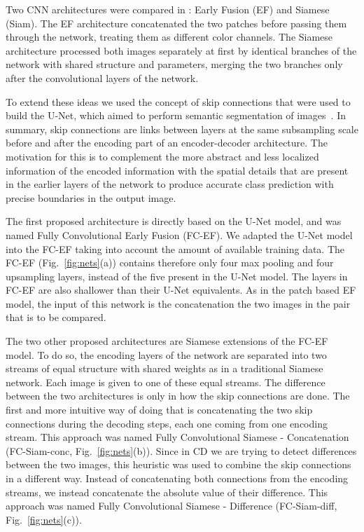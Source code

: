 \documentclass{article}
\begin{document}
Two CNN architectures were compared in \cite{daudt2018urban}: Early Fusion (EF) and Siamese (Siam). The EF architecture concatenated the two patches before passing them through the network, treating them as different color channels. The Siamese architecture processed both images separately at first by identical branches of the network with shared structure and parameters, merging the two branches only after the convolutional layers of the network. 

To extend these ideas we used the concept of skip connections that were used to build the U-Net, which aimed to perform semantic segmentation of images~\cite{ronneberger2015u}. In summary, skip connections are links between layers at the same subsampling scale before and after the encoding part of an encoder-decoder architecture. The motivation for this is to complement the more abstract and less localized information of the encoded information with the spatial details that are present in the earlier layers of the network to produce accurate class prediction with precise boundaries in the output image. 


The first proposed architecture is directly based on the U-Net model, and was named Fully Convolutional Early Fusion (FC-EF). We adapted the U-Net model into the FC-EF taking into account the amount of available training data. The FC-EF (Fig.~\ref{fig:nets}(a)) contains therefore only four max pooling and four upsampling layers, instead of the five present in the U-Net model. The layers in FC-EF are also shallower than their U-Net equivalents. As in the patch based EF model, the input of this network is the concatenation the two images in the pair that is to be compared.



The two other proposed architectures are Siamese extensions of the FC-EF model. To do so, the encoding layers of the network are separated into two streams of equal structure with shared weights as in a traditional Siamese network. Each image is given to one of these equal streams. The difference between the two architectures is only in how the skip connections are done. The first and more intuitive way of doing that is concatenating the two skip connections during the decoding steps, each one coming from one encoding stream. This approach was named Fully Convolutional Siamese - Concatenation (FC-Siam-conc, Fig.~\ref{fig:nets}(b)). Since in CD we are trying to detect differences between the two images, this heuristic was used to combine the skip connections in a different way. Instead of concatenating both connections from the encoding streams, we instead concatenate the absolute value of their difference. This approach was named Fully Convolutional Siamese - Difference (FC-Siam-diff, Fig.~\ref{fig:nets}(c)).
\end{document}
